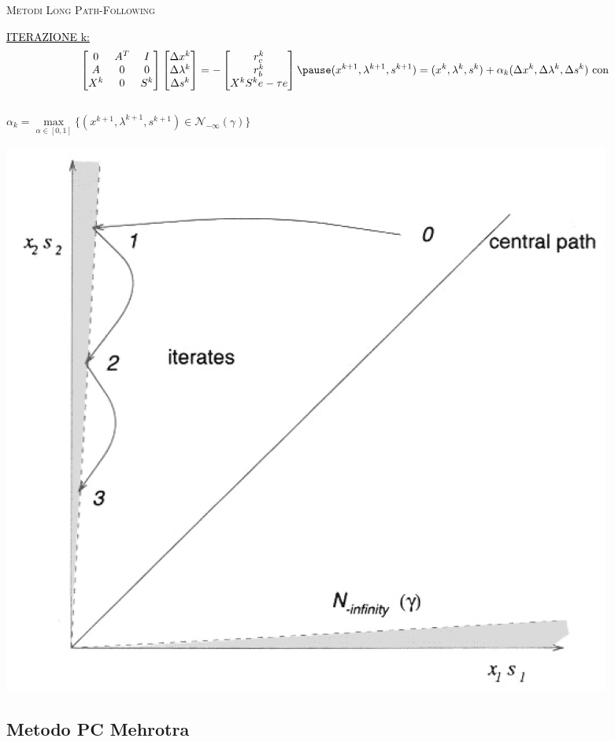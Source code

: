 
\begin{frame}[t]{\textsc{\LARGE \textcolor{burntumber}{Metodi Long Path-Following}}}
\begin{block}{\textcolor{black}{\underline{ITERAZIONE k:}}}
	\begin{equation*}	
	\begin{bmatrix}
	0&A^{T}&I \\A& 0&0\\X^{k}&0&S^{k}
	\end{bmatrix}\begin{bmatrix}
	\Delta x^{k}\\\Delta\lambda^{k} \\\Delta s^{k}
	\end{bmatrix}=-\begin{bmatrix}
	r_{c}^{k}\\r_{b}^{k}\\X^{k}S^{k}e-\tau e
	\end{bmatrix}\\
	\pause
	(x^{k+1}, \lambda^{k+1}, s^{k+1}) = (x^{k}, \lambda^{k}, s^{k})+ \alpha_{k}(\Delta x^{k}, \Delta\lambda^{k}, \Delta s^{k}) \text{ con}
	\end{equation*}\\
	$ \alpha_{k} = \max\limits_{\alpha \in[0,1]}\{(x^{k+1}, \lambda^{k+1}, s^{k+1})\in\mathcal{N}_{-\infty}(\gamma)\}$
\end{block}
\pause
\centering \includegraphics[width = 3.5 cm]{LPF.PNG}	
\end{frame}


\subsection{Metodo PC Mehrotra}

